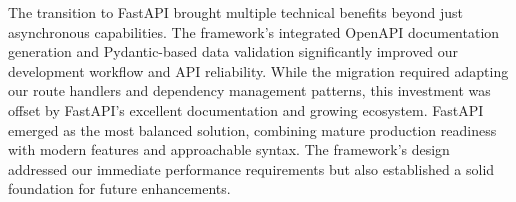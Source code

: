         The transition to FastAPI brought multiple technical benefits beyond just asynchronous capabilities. The framework's 
        integrated OpenAPI documentation generation and Pydantic-based data validation significantly improved our development 
        workflow and API reliability. While the migration required adapting our route handlers and dependency management 
        patterns, this investment was offset by FastAPI's excellent documentation and growing ecosystem. FastAPI emerged as 
        the most balanced solution, combining mature production readiness with modern features and approachable syntax. 
        The framework's design addressed our immediate performance requirements but also established a solid foundation for 
        future enhancements.